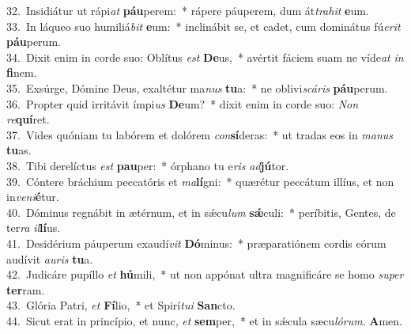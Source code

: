 {32.~}Insidiátur ut rápi\textit{at} \textbf{páu}perem:~* rápere páuperem, dum át\textit{tra}\textit{hit} \textbf{e}um.\\
{33.~}In láqueo suo humiliá\textit{bit} \textbf{e}um:~* inclinábit se, et cadet, cum dominátus fú\textit{e}\textit{rit} \textbf{páu}perum.\\
{34.~}Dixit enim in corde suo: Oblítus \textit{est} \textbf{De}us,~* avértit fáciem suam ne víde\textit{at} \textit{in} \textbf{fi}nem.\\
{35.~}Exsúrge, Dómine Deus, exaltétur ma\textit{nus} \textbf{tu}a:~* ne oblivi\textit{scá}\textit{ris} \textbf{páu}perum.\\
{36.~}Propter quid irritávit ímpi\textit{us} \textbf{De}um?~* dixit enim in corde suo: \textit{Non} \textit{re}\textbf{quí}ret.\\
{37.~}Vides quóniam tu labórem et dolórem \textit{con}\textbf{sí}deras:~* ut tradas eos in \textit{ma}\textit{nus} \textbf{tu}as.\\
{38.~}Tibi derelíctus \textit{est} \textbf{pau}per:~* órphano tu e\textit{ris} \textit{ad}\textbf{jú}tor.\\
{39.~}Cóntere bráchium peccatóris et \textit{ma}\textbf{lí}gni:~* quærétur peccátum illíus, et non in\textit{ve}\textit{ni}\textbf{é}tur.\\
{40.~}Dóminus regnábit in ætérnum, et in sǽcu\textit{lum} \textbf{sǽ}culi:~* períbitis, Gentes, de ter\textit{ra} \textit{il}\textbf{lí}us.\\
{41.~}Desidérium páuperum exaudí\textit{vit} \textbf{Dó}minus:~* præparatiónem cordis eórum audívit \textit{au}\textit{ris} \textbf{tu}a.\\
{42.~}Judicáre pupíllo \textit{et} \textbf{hú}mili,~* ut non appónat ultra magnificáre se homo \textit{su}\textit{per} \textbf{ter}ram.\\
{43.~}Glória Patri, \textit{et} \textbf{Fí}lio,~* et Spirí\textit{tu}\textit{i} \textbf{San}cto.\\
{44.~}Sicut erat in princípio, et nunc, \textit{et} \textbf{sem}per,~* et in sǽcula sæcu\textit{ló}\textit{rum}. \textbf{A}men.\\

